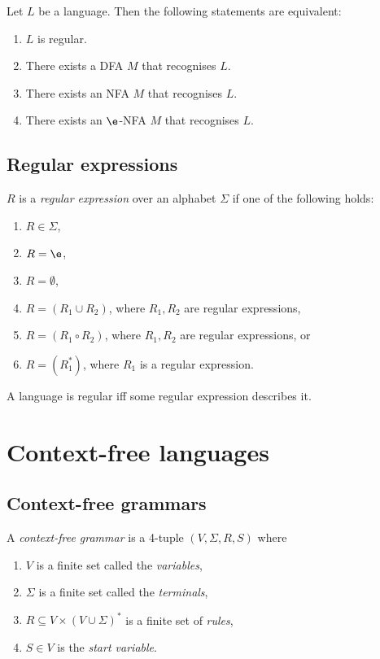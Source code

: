 \documentclass{article}
\begin{document}
\begin{theorem*}[Sipser p. 55]
	Let $L$ be a language. Then the following statements are equivalent:
	\begin{enumerate}
		\item $L$ is regular.
		\item There exists a DFA $M$ that recognises $L$.
		\item There exists an NFA $M$ that recognises $L$.
		\item There exists an $\e$-NFA $M$ that recognises $L$.
	\end{enumerate}
\end{theorem*}

\subsection{Regular expressions}

\begin{definition*}
	$R$ is a \emph{regular expression} over an alphabet $\Sigma$ if one of the following holds:
	\begin{enumerate}
		\item $R\in\Sigma$,
		\item $R=\e$,
		\item $R=\emptyset$,
		\item $R=(R_1\cup R_2)$, where $R_1,R_2$ are regular expressions,
		\item $R=(R_1\circ R_2)$, where $R_1,R_2$ are regular expressions, or
		\item $R=(R_1^*)$, where $R_1$ is a regular expression.
	\end{enumerate}
\end{definition*}

\begin{theorem*}[Sipser p. 66]
	A language is regular iff some regular expression describes it.
\end{theorem*}

\section{Context-free languages}

\subsection{Context-free grammars}

\begin{definition*}
	A \emph{context-free grammar} is a 4-tuple $(V,\Sigma,R,S)$ where
	\begin{enumerate}
		\item $V$ is a finite set called the \emph{variables},
		\item $\Sigma$ is a finite set called the \emph{terminals},
		\item $R\subseteq V\times(V\cup\Sigma)^*$ is a finite set of \emph{rules},
		\item $S\in V$ is the \emph{start variable}.
	\end{enumerate}
\end{definition*}
\end{document}
